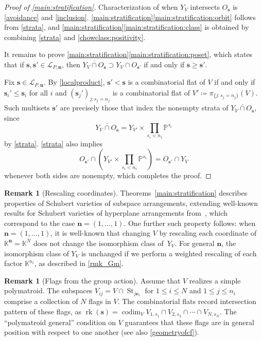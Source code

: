 \documentclass[11pt]{article}
\theoremstyle{definition}
\newtheorem{rema}[theo]{Remark}
\numberwithin{equation}{section}
\renewcommand{\P}{\mathbb{P}}
\DeclareMathOperator{\St}{St}
\newcommand{\K}{\mathbb{K}}
\DeclareMathOperator{\rk}{rk}
\DeclareMathOperator{\codim}{codim}
\begin{document}
\begin{proof}[Proof of \cref{main:stratification}]
  Characterization of when $Y_V$ intersects $O_{\mathbf s}$ is \cref{avoidance} and \cref{inclusion}.
  \cref{main:stratification}\cref{main:stratification:orbit} follows from \cref{strata}, and \cref{main:stratification}\cref{main:stratification:class} is obtained by combining \cref{strata} and \cref{chowclass:positivity}.

  It remains to prove \cref{main:stratification}\cref{main:stratification:poset}, which states that if $\mathbf s, \mathbf s' \in \mathcal L_{P, \mathbf n}$, then  $\overline{Y_V \cap O_{\mathbf s}} \supset Y_V \cap O_{\mathbf s'}$ if and only if $\mathbf s \geq \mathbf s'$.
  
  Fix $\mathbf s \in \mathcal L_{P, \mathbf n}$.
  By \cref{localproduct}, $\mathbf s' < \mathbf s$ is a combinatorial flat of $V$ if and only if $\mathbf s_i' \leq \mathbf s_i$ for all $i$ and $(\mathbf s_j')_{j :s_j = n_j}$ is a combinatorial flat of $V' \coloneqq \pi_{\{j : s_j = n_j\}}(V)$. 
  Such multisets $\mathbf s'$ are precisely those that index the nonempty strata of $\overline{Y_V \cap O_{\mathbf s}}$, since 
  \[
  \overline{Y_V \cap O_{\mathbf s}} = Y_{V'} \times \prod_{s_i < n_i} \P^{s_i}
  \]
  by \cref{strata}.
\cref{strata} also implies  
\[
O_{\mathbf s'} \cap (Y_{V'} \times \prod_{s_i < n_i} \P^{s_i}) = O_{\mathbf s'} \cap Y_V
\]
whenever both sides are nonempty, which completes the proof.
\end{proof}

\begin{rema}[Rescaling coordinates]
  Theorems~\ref{main:stratification} describes properties of Schubert varieties of subspace arrangements, extending well-known results for Schubert varieties of hyperplane arrangements from~\cite{AB16}, which correspond to the case $\mathbf n = (1, \ldots, 1)$.
  One further such property follows: when $\mathbf n = (1, \ldots, 1)$,  it is well-known that changing $V$ by rescaling each coordinate of $\K^{\mathbf n} = \K^N$ does not change the isomorphism class of~$Y_V$.
  For general $\mathbf n$, the isomorphism class of $Y_V$ is unchanged if we perform a weighted rescaling of each factor $\K^{n_i}$, as described in \cref{rmk_Gm}.
\end{rema}
\begin{rema}[Flags from the group action]\label{flagperspective}
  Assume that $V$ realizes a simple polymatroid.
  The subspaces $V_{ij} = V \cap \St_{j \mathbf e_i}$ for $1 \leq i \leq N$ and $1 \leq j \leq n_i$ comprise a collection of $N$ flags in $V$. The combinatorial flats record intersection pattern of these flags, as $\rk(\mathbf s) = \codim_V V_{1,s_1} \cap V_{2,s_2} \cap \cdots \cap V_{N,s_N}$.
The ``polymatroid general'' condition on $V$ guarantees that these flags are in general position with respect to one another (see also \cref{geometryofcf}).
\end{rema}
\end{document}

